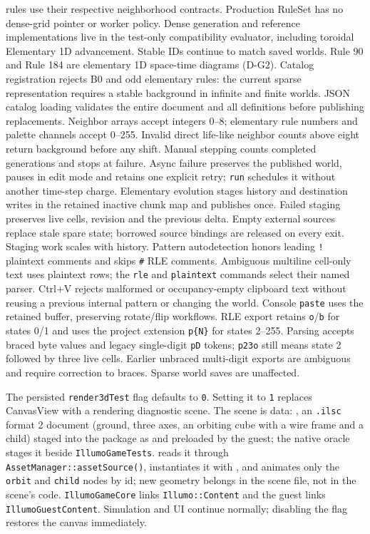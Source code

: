 rules use their
respective neighborhood contracts. Production RuleSet has no dense-grid pointer
or worker policy. Dense generation and reference implementations live in the
test-only compatibility evaluator, including toroidal Elementary 1D advancement.
Stable IDs continue to match saved worlds. Rule 90 and Rule 184 are elementary
1D space-time diagrams (D-G2). Catalog registration rejects B0 and odd
elementary rules: the current sparse representation requires a stable
background in infinite and finite worlds. JSON catalog loading validates the
entire document and all definitions before publishing replacements. Neighbor
arrays accept integers 0--8; elementary rule numbers and palette channels
accept 0--255. Invalid direct life-like neighbor counts above eight return
background before any shift.
Manual stepping counts completed generations and stops at failure. Async failure
preserves the published world, pauses in edit mode and retains one explicit
retry; \texttt{run} schedules it without another time-step charge. Elementary
evolution stages history and destination writes in the retained inactive chunk
map and publishes once. Failed staging preserves live cells, revision and the
previous delta. Empty external sources replace stale spare state; borrowed
source bindings are released on every exit. Staging work scales with history.
Pattern autodetection honors leading \texttt{!} plaintext comments and skips
\texttt{\#} RLE comments. Ambiguous multiline cell-only text uses plaintext
rows; the \texttt{rle} and \texttt{plaintext} commands select their named
parser. Ctrl+V rejects malformed or occupancy-empty clipboard text without
reusing a previous internal pattern or changing the world. Console
\texttt{paste} uses the retained buffer, preserving rotate/flip workflows.
RLE export retains \texttt{o}/\texttt{b} for states 0/1 and uses the project
extension \texttt{p\{N\}} for states 2--255. Parsing accepts braced byte values
and legacy single-digit \texttt{pD} tokens; \texttt{p23o} still means state 2
followed by three live cells. Earlier unbraced multi-digit exports are ambiguous
and require correction to braces. Sparse world saves are unaffected.

The persisted \texttt{render3dTest} flag defaults to \texttt{0}. Setting it to
\texttt{1} replaces CanvasView with a rendering diagnostic scene. The scene is
data: , an \texttt{.ilsc} format 2
document (ground, three axes, an orbiting cube with a wire frame and a child)
staged into the package as  and preloaded
by the guest; the native oracle stages it beside \texttt{IllumoGameTests}.
 reads it through
\texttt{AssetManager::assetSource()}, instantiates it with
, and animates only the \texttt{orbit} and
\texttt{child} nodes by id; new geometry belongs in the scene file, not in the
scene's code. \texttt{IllumoGameCore} links \texttt{Illumo::Content} and the guest
links \texttt{IllumoGuestContent}. Simulation and UI continue normally;
disabling the flag restores the canvas immediately.

